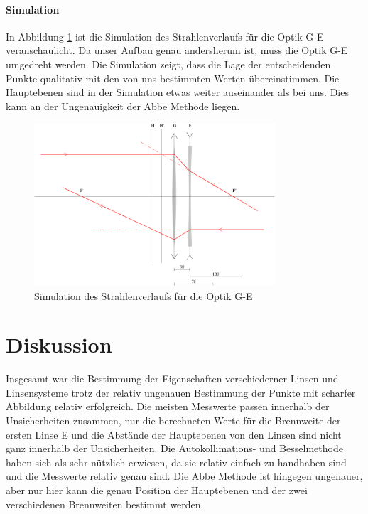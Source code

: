 \documentclass[11pt, a4paper]{article}
\begin{document}
    \paragraph{Simulation}
    In Abbildung \ref{fig:sim} ist die Simulation des Strahlenverlaufs für die Optik G-E veranschaulicht. Da unser Aufbau genau andersherum ist, muss die Optik G-E umgedreht werden. Die Simulation zeigt, dass die Lage der entscheidenden Punkte qualitativ mit den von uns bestimmten Werten übereinstimmen. Die Hauptebenen sind in der Simulation etwas weiter auseinander als bei uns. Dies kann an der Ungenauigkeit der Abbe Methode liegen.

    \begin{figure}[h]
        \centering
        \includegraphics[width=0.8\textwidth]{G-E-30.pdf}
        \caption{Simulation des Strahlenverlaufs für die Optik G-E}
        \label{fig:sim}
    \end{figure}

    \section{Diskussion}

    Insgesamt war die Bestimmung der Eigenschaften verschiederner Linsen und Linsensysteme trotz der relativ ungenauen Bestimmung der Punkte mit scharfer Abbildung relativ erfolgreich. Die meisten Messwerte passen innerhalb der Unsicherheiten zusammen, nur die berechneten Werte für die Brennweite der ersten Linse E und die Abstände der Hauptebenen von den Linsen sind nicht ganz innerhalb der Unsicherheiten. Die Autokollimations- und Besselmethode haben sich als sehr nützlich erwiesen, da sie relativ einfach zu handhaben sind und die Messwerte relativ genau sind. Die Abbe Methode ist hingegen ungenauer, aber nur hier kann die genau Position der Hauptebenen und der zwei verschiedenen Brennweiten bestimmt werden.
\end{document}
